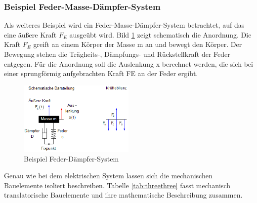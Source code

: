 \subsubsection{Beispiel Feder-Masse-Dämpfer-System}
Als weiteres Beispiel wird ein Feder-Masse-Dämpfer-System betrachtet, auf das eine äußere Kraft $F_{E}$ ausgeübt wird. Bild \ref{fig:FDSBeispiel} zeigt schematisch die Anordnung. Die Kraft $F_{E}$ greift an einem Körper der Masse m an und bewegt den Körper. Der Bewegung stehen die Trägheits-, Dämpfungs- und Rückstellkraft der Feder entgegen. Für die Anordnung soll die Auslenkung x berechnet werden, die sich bei
einer sprungförmig aufgebrachten Kraft FE an der Feder ergibt.

\begin{figure}[ht]
  \centerline{\includegraphics[width=0.5\textwidth]{Kapitel2/Bilder/image6}}
  \caption{Beispiel Feder-Dämpfer-System}
  \label{fig:FDSBeispiel}
\end{figure}

\noindent Genau wie bei dem elektrischen System lassen sich die mechanischen Bauelemente isoliert beschreiben. Tabelle \ref{tab:threethree} fasst mechanisch translatorische Bauelemente und ihre mathematische Beschreibung
zusammen.

